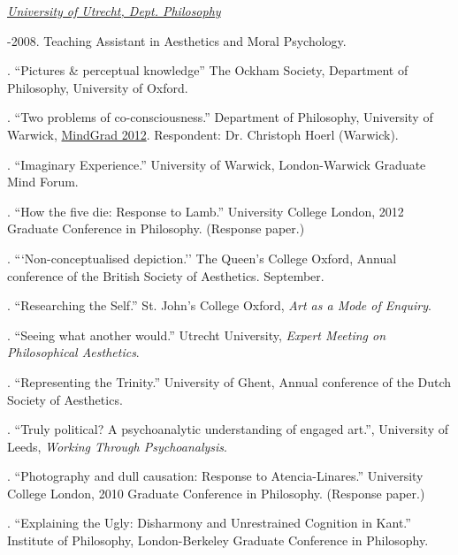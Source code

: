 \documentclass[11pt]{article}
\begin{document}
\medskip

\noindent\href{http://www.uu.nl/faculty/humanities/EN/organisation/departments/departmentofphilosophy/Pages/default.aspx}{\emph{University of Utrecht, Dept. Philosophy} \vspace{0.01in}}

-2008. Teaching Assistant in Aesthetics and Moral Psychology.

\bigskip

\newpage
\medskip
{}. ``Pictures \& perceptual knowledge'' The Ockham Society, Department of Philosophy, University of Oxford.

. ``Two problems of co-consciousness.'' Department of Philosophy, University of Warwick, \href{http://www2.warwick.ac.uk/fac/soc/philosophy/news/conferences/mindgrad-2012/}{MindGrad 2012}. Respondent: Dr. Christoph Hoerl (Warwick).

. ``Imaginary Experience.'' University of Warwick, London-Warwick Graduate Mind Forum.

. ``How the five die: Response to Lamb.'' University College London, 2012 Graduate Conference in Philosophy. (Response paper.)

. ```Non-conceptualised depiction.'' The Queen's College Oxford, Annual conference of the British Society of Aesthetics. September.

. ``Researching the Self.'' St. John's College Oxford, \emph{Art as a Mode of Enquiry}.

. ``Seeing what another would.'' Utrecht University, \emph{Expert Meeting on Philosophical Aesthetics}.

. ``Representing the Trinity.'' University of Ghent, Annual conference of the Dutch Society of Aesthetics.

. ``Truly political? A psychoanalytic understanding of engaged art.'', University of Leeds, \emph{Working Through Psychoanalysis}.

. ``Photography and dull causation: Response to Atencia-Linares.'' University College London, 2010 Graduate Conference in Philosophy. (Response paper.)

. ``Explaining the Ugly: Disharmony and Unrestrained Cognition in Kant.'' Institute of Philosophy, London-Berkeley Graduate Conference in Philosophy.

\bigskip
\end{document}
